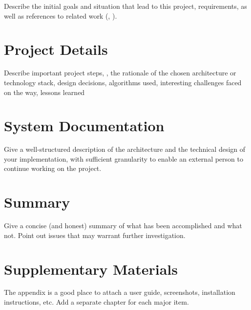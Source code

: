 \documentclass[notitlepage,english,smartquotes]{hgbreport}
\begin{document}
Describe the initial goals and situation that lead to this project, requirements, as well as
references to related work (\eg, \cite{Higham1998}).



\chapter{Project Details}

Describe important project steps, \eg, the rationale of the chosen architecture or technology stack, 
design decisions, algorithms used, interesting challenges faced on the way, lessons 
learned \etc


\chapter{System Documentation}

Give a well-structured description of the architecture and the technical design
of your implementation,
with sufficient granularity to enable an external person to
continue working on the project.


\chapter{Summary}

Give a concise (and honest) summary of what has been accomplished and what not. 
Point out issues that may warrant further investigation.


\appendix %


\chapter{Supplementary Materials}

The appendix is a good place to attach a user guide, screenshots, installation instructions, etc.
Add a separate chapter for each major item.


\MakeBibliography[nosplit]
\end{document}

